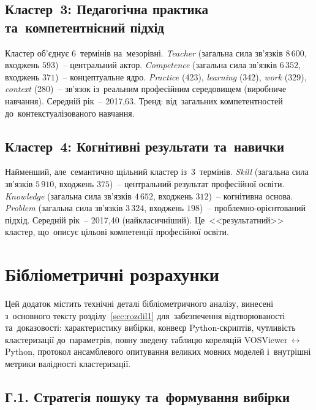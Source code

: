\subsection*{Кластер~3: Педагогічна практика та~компетентнісний підхід}

Кластер об'єднує 6~термінів на~мезорівні. \textit{Teacher} (загальна сила зв'язків $8\,600$, входжень $593$)~-- центральний актор. \textit{Competence} (загальна сила зв'язків $6\,352$, входжень $371$)~-- концептуальне ядро. \textit{Practice} (423), \textit{learning} (342), \textit{work} (329), \textit{context} (280)~-- зв'язок із~реальним професійним середовищем (виробниче навчання). Середній рік~-- 2017,63. Тренд: від~загальних компетентностей до~контекстуалізованого навчання.

\subsection*{Кластер~4: Когнітивні результати та~навички}

Найменший, але~семантично щільний кластер із~3~термінів. \textit{Skill} (загальна сила зв'язків $5\,910$, входжень $375$)~-- центральний результат професійної освіти. \textit{Knowledge} (загальна сила зв'язків $4\,652$, входжень $312$)~-- когнітивна основа. \textit{Problem} (загальна сила зв'язків $3\,324$, входжень $198$)~-- проблемно-орієнтований підхід. Середній рік~-- 2017,40 (найкласичніший). Це~<<результатний>> кластер, що~описує цільові компетенції професійної освіти.


\clearpage
\section{Бібліометричні розрахунки}
\label{app:bibliometric}

Цей додаток містить технічні деталі бібліометричного аналізу, винесені з~основного тексту розділу~\ref{sec:rozdil1} для~забезпечення відтворюваності та~доказовості: характеристику вибірки, конвеєр Python-скриптів, чутливість кластеризації до~параметрів, повну зведену таблицю кореляцій VOSViewer\,$\leftrightarrow$\,Python, протокол ансамблевого опитування великих мовних моделей і~внутрішні метрики валідності кластеризації.

\subsection*{Г.1. Стратегія пошуку та~формування вибірки}
\label{app:bibliometric-search}

